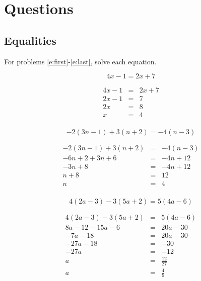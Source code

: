 \documentclass[fleqn,addpoints]{exam}
\begin{document}
\fi

\section{Questions}

\subsection{Equalities}

For problems \ref{e:first}-\ref{e:last}, solve each equation.

\begin{questions}

\question[5]
\label{e:first}
\[ 4x - 1 = 2x + 7 \]
\begin{solution}[4 cm]
\begin{eqnarray*}
  4x - 1 &=& 2x + 7 \\
  2x - 1 &=& 7 \\
  2x     &=& 8 \\
  x      &=& 4 \\
\end{eqnarray*}
\end{solution}

\question[5]
\label{e:first}
\[ -2(3n - 1) + 3(n + 2) = -4(n - 3) \]
\begin{solution}[4 cm]
\begin{eqnarray*}
  -2(3n - 1) + 3(n + 2) &=& -4(n - 3) \\
  -6n + 2 + 3n + 6 &=& -4n + 12  \\
  -3n + 8 &=& -4n + 12  \\
  n + 8 &=& 12  \\
  n  &=& 4  \\
\end{eqnarray*}
\end{solution}

\question[5]
\label{e:first}
\[ 4(2a - 3) - 3(5a + 2) = 5(4a - 6) \]
\begin{solution}[4 cm]
\begin{eqnarray*}
  4(2a - 3) - 3(5a + 2) &=& 5(4a - 6) \\
  8a - 12 - 15a - 6 &=& 20a - 30 \\
  -7a - 18  &=& 20a - 30 \\
  -27a - 18 &=& -30 \\
  -27a      &=& -12 \\
  a         &=& \frac{12}{27} \\
  a         &=& \frac{4}{9} \\
\end{eqnarray*}
\end{solution}


\end{questions}
\end{document}
